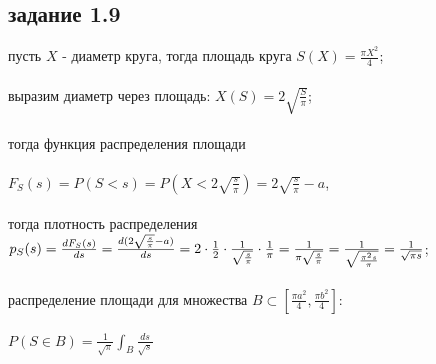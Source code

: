 \documentclass[a4paper]{article}
\begin{document}
\begin{large}
	\section*{задание 1.9}
	пусть $X$ - диаметр круга, тогда площадь круга $S(X)=\frac{\pi X^2}{4}$;\\\\
	выразим диаметр через площадь: $X(S)=2\sqrt{\frac{S}{\pi}}$;\\\\
	тогда функция распределения площади\\\\ $F_S(s)=P(S<s)=P(X<2\sqrt{\frac{s}{\pi}})=2\sqrt{\frac{s}{\pi}}-a$,\\\\
	тогда плотность распределения $p_S(s)=\frac{dF_S(s)}{ds}=\frac{d(2\sqrt{\frac{s}{\pi}}-a)}{ds}=\\\\2\cdot \frac{1}{2}\cdot \frac{1}{\sqrt{\frac{s}{\pi}}}\cdot \frac{1}{\pi}=\frac{1}{\pi\sqrt{\frac{s}{\pi}}}=\frac{1}{\sqrt{\frac{\pi^2s}{\pi}}}=\frac{1}{\sqrt{\pi s}}$;\\\\
	распределение площади для множества $B\subset[\frac{\pi a^2}{4},\frac{\pi b^2}{4}]$:\\\\
	$P(S\in B)=\frac{1}{\sqrt{\pi}}\int_B \frac{ds}{\sqrt{s}}$

\end{large}
\end{document}
